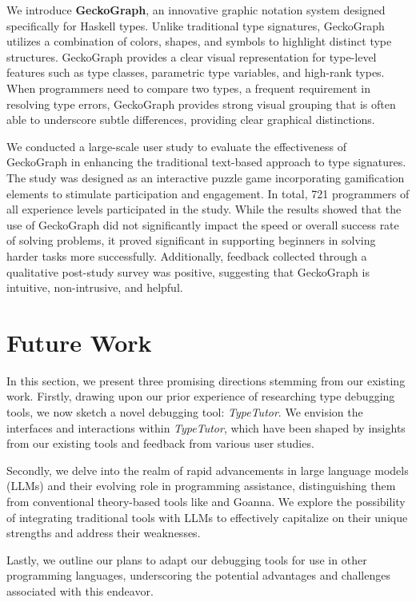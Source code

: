We introduce \textbf{GeckoGraph}, an innovative graphic notation system designed specifically for Haskell types. Unlike traditional type signatures, GeckoGraph utilizes a combination of colors, shapes, and symbols to highlight distinct type structures. GeckoGraph provides a clear visual representation for type-level features such as type classes, parametric type variables, and high-rank types. When programmers need to compare two types, a frequent requirement in resolving type errors, GeckoGraph provides strong visual grouping that is often able to underscore subtle differences, providing clear graphical distinctions.

We conducted a large-scale user study to evaluate the effectiveness of GeckoGraph in enhancing the traditional text-based approach to type signatures. The study was designed as an interactive puzzle game incorporating gamification elements to stimulate participation and engagement. In total,  721 programmers of all experience levels participated in the study. While the results showed that the use of GeckoGraph did not significantly impact the speed or overall success rate of solving problems, it proved significant in supporting beginners in solving harder tasks more successfully. Additionally, feedback collected through a qualitative post-study survey was positive, suggesting that GeckoGraph is intuitive, non-intrusive, and helpful.

\section{Future Work}

In this section, we present three promising directions stemming from our existing work. Firstly, drawing upon our prior experience of researching type debugging tools, we now sketch a novel debugging tool: \textit{TypeTutor}. We envision the interfaces and interactions within \textit{TypeTutor}, which have been shaped by insights from our existing tools and feedback from various user studies.

Secondly, we delve into the realm of rapid advancements in large language models (LLMs) and their evolving role in programming assistance, distinguishing them from conventional theory-based tools like \chameleon{} and Goanna. We explore the possibility of integrating traditional tools with LLMs to effectively capitalize on their unique strengths and address their weaknesses.

Lastly, we outline our plans to adapt our debugging tools for use in other programming languages, underscoring the potential advantages and challenges associated with this endeavor.

